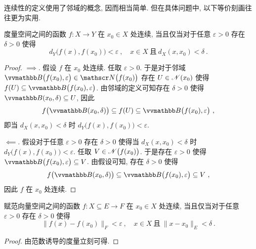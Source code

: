 连续性的定义使用了邻域的概念, 因而相当简单. 但在具体问题中, 以下等价刻画往往更为实用.

\begin{proposition}\label{prop:charact-of-continuity-in-metric-spaces}
    度量空间之间的函数 \(f \colon X \to Y\) 在 \(x_0 \in X\) 处连续, 当且仅当对于任意 \(\varepsilon > 0\) 存在 \(\delta > 0\) 使得
    \[
        d_Y \bigl(f(x), f(x_0)\bigr) < \varepsilon\ ,\quad  x \in X\ \text{且}\ d_X(x, x_0) < \delta\ .
    \]
\end{proposition}

\begin{proof}
    \(\implies\). 假设 \(f\) 在 \(x_0\) 处连续. 任取 \(\varepsilon > 0\). 于是对于邻域 \(\B \bigl(f(x_0), \varepsilon\bigr) \in \nbr \big(f(x_0)\big)\) 存在 \(U \in \mathscr N(x_0)\) 使得 \(f(U) \subseteq \B \bigl(f(x_0), \varepsilon\bigr)\). 由邻域的定义可知存在 \(\delta > 0\) 使得 \(\B(x_0, \delta) \subseteq U\), 因此
    \[
        f \bigl(\B(x_0, \delta)\bigr) \subseteq f(U) \subseteq \B \bigl(f(x_0), \varepsilon\bigr)\ ,
    \]
    即当 \(d_X(x, x_0) < \delta\) 时 \(d_Y \bigl(f(x), f(x_0)\bigr) < \varepsilon\).

    \(\impliedby\). 假设对于任意 \(\varepsilon > 0\) 存在 \(\delta > 0\) 使得当 \(d_X(x, x_0) < \delta\) 时 \(d_Y \bigl(f(x), f(x_0)\bigr) < \varepsilon\). 任取 \(V \in \mathscr N \big(f(x_0)\big)\). 于是存在 \(\varepsilon > 0\) 使得 \(\B \bigl(f(x_0), \varepsilon\bigr) \subseteq V\). 由假设可知, 存在 \(\delta > 0\) 使得
    \[
        f \bigl(\B(x_0, \delta)\bigr) \subseteq \B \bigl(f(x_0), \varepsilon\bigr) \subseteq V\ ,
    \]
    因此 \(f\) 在 \(x_0\) 处连续.
\end{proof}

\begin{corollary}
    赋范向量空间之间的函数 \(f \colon X \subseteq E \to F\) 在 \(x_0 \in X\) 处连续, 当且仅当对于任意 \(\varepsilon > 0\) 存在 \(\delta > 0\) 使得
    \[
        \|f(x) - f(x_0)\|_F < \varepsilon\ ,\quad x \in X\ \text{且}\ \|x - x_0\|_E < \delta\ .
    \]
\end{corollary}

\begin{proof}
    由范数诱导的度量立刻可得.
\end{proof}

